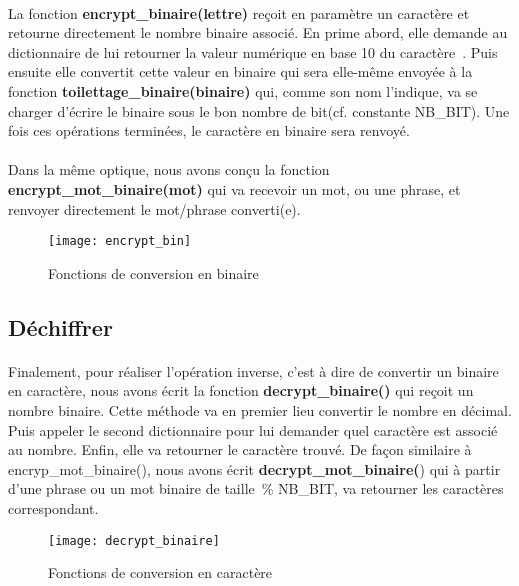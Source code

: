 \documentclass[11pt,fleqn]{book} %
\begin{document}
\paragraph{}La fonction \textbf{encrypt\_binaire(lettre)} reçoit en paramètre un caractère et retourne directement le nombre binaire associé. En prime abord, elle demande au dictionnaire de lui retourner la valeur numérique en base 10 du caractère . Puis ensuite elle convertit cette valeur en binaire qui sera elle-même envoyée à la fonction \textbf{toilettage\_binaire(binaire)} qui, comme son nom l'indique, va se charger d'écrire le binaire sous le bon nombre de bit(cf. constante NB\_BIT).
Une fois ces opérations terminées, le caractère en binaire sera renvoyé.
\\\\Dans la même optique, nous avons conçu la fonction \textbf{encrypt\_mot\_binaire(mot)}  qui va recevoir un mot, ou une phrase, et renvoyer directement le mot/phrase converti(e). 

\begin{figure}[!h]
\centering\texttt{[image: encrypt\_bin]}
\caption{Fonctions de conversion en binaire}

\end{figure}


\subsection{Déchiffrer}

\paragraph{}Finalement, pour réaliser l'opération inverse, c'est à dire de convertir un binaire en caractère, nous avons écrit la fonction \textbf{decrypt\_binaire()} qui reçoit un nombre binaire. Cette méthode va en premier lieu convertir le nombre en décimal. Puis appeler le second dictionnaire pour lui demander quel caractère est associé au nombre. Enfin, elle va retourner le caractère trouvé. De façon similaire à encryp\_mot\_binaire(), nous avons écrit \textbf{decrypt\_mot\_binaire(}) qui à partir d'une phrase ou un mot binaire de taille \% NB\_BIT, va retourner les caractères correspondant.

\begin{figure}[!h]
\centering\texttt{[image: decrypt\_binaire]}
\caption{Fonctions de conversion en caractère}
\label{fig:nonfloat}
\end{figure}
\end{document}
